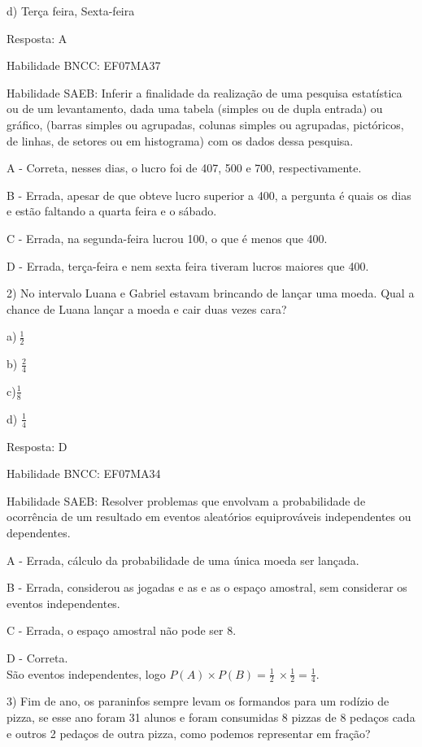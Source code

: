 {d) Terça feira, Sexta-feira

Resposta: A

Habilidade BNCC: EF07MA37

Habilidade SAEB: Inferir a finalidade da realização de uma pesquisa
estatística ou de um levantamento, dada uma tabela (simples ou de dupla
entrada) ou gráfico, (barras simples ou agrupadas, colunas simples ou
agrupadas, pictóricos, de linhas, de setores ou em histograma) com os
dados dessa pesquisa.~

A - Correta, nesses dias, o lucro foi de 407, 500 e 700,
respectivamente.

B - Errada, apesar de que obteve lucro superior a 400, a pergunta é
quais os dias e estão faltando a quarta feira e o sábado.

C - Errada, na segunda-feira lucrou 100, o que é menos que 400.

D - Errada, terça-feira e nem sexta feira tiveram lucros maiores que
400.

2) No intervalo Luana e Gabriel estavam brincando de lançar uma moeda.
Qual a chance de Luana lançar a moeda e cair duas vezes cara?

a)\(\ \frac{1}{2}\)

b) \(\frac{2}{4}\)

c)\(\frac{1}{8}\)

d) \(\frac{1}{4}\)

Resposta: D

Habilidade BNCC: EF07MA34

Habilidade SAEB: Resolver problemas que envolvam a probabilidade de
ocorrência de um resultado em eventos aleatórios equiprováveis
independentes ou dependentes.

A - Errada, cálculo da probabilidade de uma única moeda ser lançada.

B - Errada, considerou as jogadas e as e as o espaço amostral, sem
considerar os eventos independentes.

C - Errada, o espaço amostral não pode ser 8.

D - Correta.\\
São eventos independentes, logo
\(P\left( A \right) \times P\left( B \right) = \frac{1}{2}\  \times \frac{1}{2} = \frac{1}{4}\).

3) Fim de ano, os paraninfos sempre levam os formandos para um rodízio
de pizza, se esse ano foram 31 alunos e foram consumidas 8 pizzas de 8
pedaços cada e outros 2 pedaços de outra pizza, como podemos representar
em fração?

}
